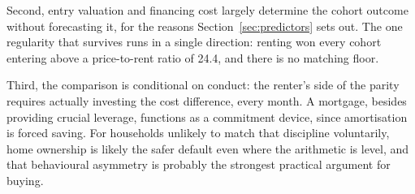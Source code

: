 Second, entry valuation and financing cost largely determine the cohort outcome without forecasting it, for the reasons Section~\ref{sec:predictors} sets out. The one regularity that survives runs in a single direction: renting won every cohort entering above a price-to-rent ratio of 24.4, and there is no matching floor.

Third, the comparison is conditional on conduct: the renter's side of the parity requires actually investing the cost difference, every month. A mortgage, besides providing crucial leverage, functions as a commitment device, since amortisation is forced saving. For households unlikely to match that discipline voluntarily, home ownership is likely the safer default even where the arithmetic is level, and that behavioural asymmetry is probably the strongest practical argument for buying.